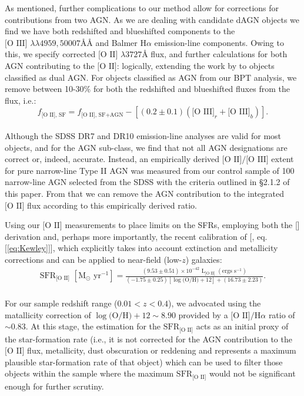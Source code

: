 As mentioned, further complications to our method allow for corrections for contributions from two AGN. As we are dealing with candidate dAGN objects we find we have both redshifted and blueshifted components to the $\text{[O III] }\lambda\lambda4959,50007ÅÅ$ and Balmer $\text{H}\alpha$ emission-line components. Owing to this, we specify corrected $\text{[O II] }\lambda3727Å$ flux, and further calculations for both AGN contributing to the $\text{[O II]}$: logically, extending the work by \cite{2006ApJ...642..702K} to objects classified as dual AGN. For objects classified as AGN from our BPT analysis, we remove between 10-30\% for both the redshifted and blueshifted \text{[O III]} fluxes from the \text{[O II]} flux, i.e.:
\\
\begin{equation}
\label{eq:KimCorrection}
f_{\text{[O II], SF}}=f_{\text{[O II], SF+AGN}}-\left[(0.2\pm{0.1})(\text{[O III]}_r+\text{[O III]}_b)\right].
\end{equation}
\\
Although the SDSS DR7 and DR10 emission-line analyses are valid for most objects, and for the AGN sub-class, we find that not all AGN designations are correct or, indeed, accurate. Instead, an empirically derived $\text{[O II]}/\text{[O III]}$ extent for pure narrow-line Type II AGN was measured from our control sample of 100 narrow-line AGN selected from the SDSS with the criteria outlined in §2.1.2 of this paper. From that we can remove the AGN contribution to the integrated $\text{[O II]}$ flux according to this empirically derived ratio.

Using our $\text{[O II]}$ measurements to place limits on the SFRs, employing both the [\cite{Kennicutt_1998}] derivation and, perhaps more importantly, the recent calibration of [\cite{Kewley_2004}, eq. [\ref{eq:Kewley}]], which explicitly takes into account extinction and metallicity corrections and can be applied to near-field (low-$z$) galaxies:
\\
\begin{equation}
\begin{align}
\label{eq:Kewley}
{\text{SFR}}_{\text{[O II]}}\,\,[\text{M}_\odot \text{ yr}^{-1}]=\frac{(9.53\pm{0.51})\times10^{-42}\,\,\text{L}_{\text{[O II]}}\,\,(\text{ergs }\text{s}^{-1})}{(-1.75\pm{0.25})[\log{\text{(O/H)}}+12]+(16.73\pm{2.23})}.
\end{align}
\end{equation}
\\
For our sample redshift range (${{0.01}<{z}<{0.4}}$), we advocated using the \cite{Teplitz_2003} matallicity correction of $\log{\text{(O/H)} +12}\sim{8.90}$ provided by a $\text{[O II]/H}\alpha$ ratio of $\sim{0.83}$. At this stage, the \cite{Kennicutt_1998} estimation for the $\text{SFR}_{\text{[O II]}}$ acts as an initial proxy of the star-formation rate (i.e., it is not corrected for the AGN contribution to the $\text{[O II]}$ flux, metallicity, dust obscuration or reddening and represents a maximum plausible star-formation rate of that object) which can be used to filter those objects within the sample where the maximum $\text{SFR}_{\text{[O II]}}$ would not be significant enough for further scrutiny.

